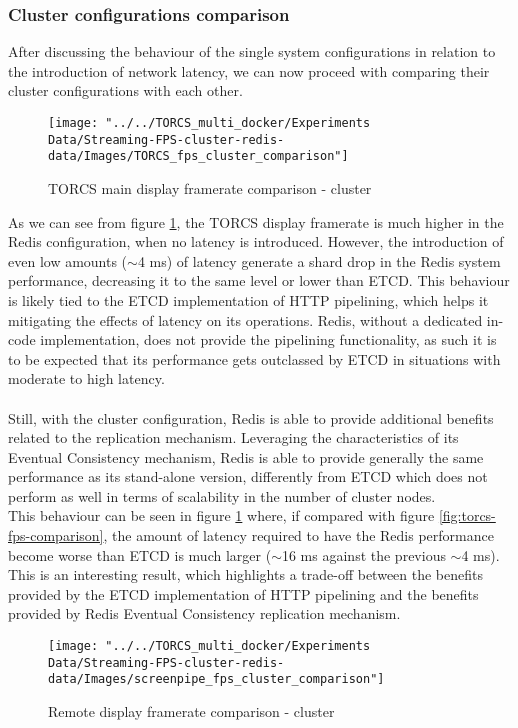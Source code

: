 \subsubsection{Cluster configurations comparison}
After discussing the behaviour of the single system configurations in relation to the introduction of network latency, we can now proceed with comparing their cluster configurations with each other.
\begin{figure}[h!]
	\centering
	\texttt{[image: "../../TORCS\_multi\_docker/Experiments Data/Streaming-FPS-cluster-redis-data/Images/TORCS\_fps\_cluster\_comparison"]}
	\caption[TORCS main display framerate comparison - cluster]{TORCS main display framerate comparison - cluster}
	\label{fig:torcs-fps-cluster-comparison}
\end{figure}
As we can see from figure \ref{fig:torcs-fps-cluster-comparison}, the TORCS display framerate is much higher in the Redis configuration, when no latency is introduced. However, the introduction of even low amounts ($\sim{}$4 ms) of latency generate a shard drop in the Redis system performance, decreasing it to the same level or lower than ETCD. This behaviour is likely tied to the ETCD implementation of HTTP pipelining, which helps it mitigating the effects of latency on its operations. Redis, without a dedicated in-code implementation, does not provide the pipelining functionality, as such it is to be expected that its performance gets outclassed by ETCD in situations with moderate to high latency. \\ \\
Still, with the cluster configuration, Redis is able to provide additional benefits related to the replication mechanism. Leveraging the characteristics of its Eventual Consistency mechanism, Redis is able to provide generally the same performance as its stand-alone version, differently from ETCD which does not perform as well in terms of scalability in the number of cluster nodes. \\
This behaviour can be seen in figure \ref{fig:torcs-fps-cluster-comparison} where, if compared with figure \ref{fig:torcs-fps-comparison}, the amount of latency required to have the Redis performance become worse than ETCD is much larger ($\sim{}$16 ms against the previous $\sim{}$4 ms). This is an interesting result, which highlights a trade-off between the benefits provided by the ETCD implementation of HTTP pipelining and the benefits provided by Redis Eventual Consistency replication mechanism.
\begin{figure}[h!]
	\centering
	\texttt{[image: "../../TORCS\_multi\_docker/Experiments Data/Streaming-FPS-cluster-redis-data/Images/screenpipe\_fps\_cluster\_comparison"]}
	\caption[Remote display framerate comparison - cluster]{Remote display framerate comparison - cluster}
	\label{fig:screenpipe-fps-cluster-comparison}
\end{figure}

